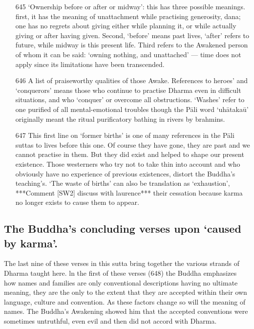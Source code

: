 \begin{itemize}
\item[645] `Ownership before or after or midway': this has three possible meanings. first, it has the meaning of unattachment while practising generosity, dana; one has no regrets about giving either while planning it, or while actually giving or after having given. Second, `before' means past lives, `after' refers to future, while midway is this present life. Third refers to the Awakened person of whom it can be said: `owning nothing, and unattached' — time does not apply since its limitations have been transcended.

\item[646] A list of praiseworthy qualities of those Awake. References to heroes' and `conquerors' means those who continue to practise Dharma even in difficult situations, and who `conquer' or overcome all obstructions. `Washes' refer to one purified of all mental-emotional troubles though the P\=ali word `uh\=ataka\=u' originally meant the ritual purificatory bathing in rivers by brahmins.

\item[647] This ﬁrst line on `former births' is one of many references in the P\=ali suttas to lives before this one. Of course they have gone, they are past and we cannot practise in them. But they did exist and helped to shape our present existence. Those westerners who try not to take thin into account and who obviously have no experience of previous existences, distort the Buddha's teaching's. `The waste of births' can also be translation as `exhaustion', ***Comment [SW2] discuss with laurence*** their cessation because karma no longer exists to cause them to appear.
\end{itemize}

\subsection{The Buddha's concluding verses upon `caused by karma'.}
The last nine of these verses in this sutta bring together the various strands of Dharma taught here. ln the first of these verses (648) the Buddha emphasizes how names and families are only conventional descriptions having no ultimate meaning, they are the only to the extent that they are accepted within their own language, culture and convention. As these factors change so will the meaning of names. The Buddha's Awakening showed him that the accepted conventions were sometimes untruthful, even evil and then did not accord with Dharma.\\

